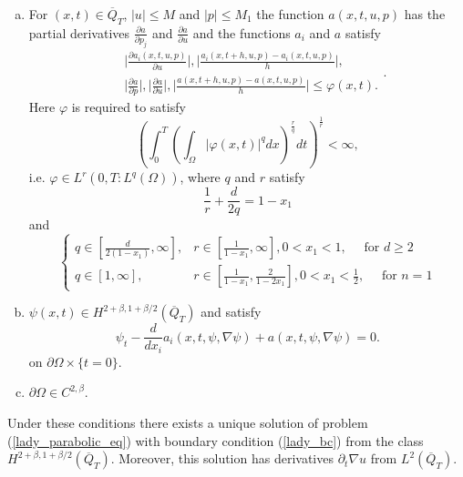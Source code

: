 \documentclass[11pt, a4paper]{article}
\begin{document}
\begin{theorem}
\begin{enumerate}[a)]
	\item For $(x,t) \in \overline{Q}_T$, $|u| \leq M$ and $|p| \leq M_1$ the function $a(x,t,u,p)$ has the partial derivatives $\frac{\partial a}{\partial p_j}$ and $\frac{\partial a}{\partial u}$ and the functions $a_i$ and $a$ satisfy
	\begin{equation}
	\label{exist_cond4}
	\begin{split}
		&\Bigg| \frac{\partial a_i(x,t,u,p)}{\partial u}\Bigg|, \Bigg|\frac{a_i(x,t+h,u,p) - 		a_i(x,t,u,p)}{h}\Bigg|, \\
		&\Bigg|\frac{\partial a}{\partial p}\Bigg|, \Bigg|\frac{\partial a}{\partial u}\Bigg|, \Bigg|\frac{a(x,t+h,u,p) - a(x,t,u,p)}{h} \Bigg| \leq \varphi(x,t).
	\end{split}.
	\end{equation}
	Here $\varphi$ is required to satisfy
	\begin{equation*}
	\left( \int_0^T \left(\int_\Omega |\varphi(x,t)|^q dx\right)^\frac{r}{q} dt 			\right)^\frac{1}{r} < \infty,
	\end{equation*}
	i.e. $\varphi \in L^r(0,T: L^q(\Omega))$, where $q$ and $r$ satisfy
	\begin{equation*}
	\frac{1}{r} + \frac{d}{2q} = 1 - x_1
	\end{equation*}
	and
	\begin{equation*}
	\begin{cases}
		q\in \left[\frac{d}{2(1-x_1)},\infty\right], &r\in \left[\frac{1}{1-x_1},\infty \right], 0<x_1<1, \quad \text{ for } d \geq 2 \\
		q \in [1, \infty], &r \in \left[\frac{1}{1-x_1},\frac{2}{1-2x_1}\right], 0<x_1<\frac{1}{2}, \quad \text{ for } n=1
	\end{cases}
\end{equation*}
	
	\item $\psi(x,t) \in H^{2+\beta, 1+\beta/2}(\overline{Q}_T)$ and satisfy
	\begin{equation}
	\label{exist_cond5}
	\psi_t - \frac{d}{dx_i}a_i(x,t,\psi,\nabla\psi) + a(x,t,\psi,\nabla\psi) = 0.
	\end{equation}
	on $\partial \Omega \times \{t=0\}$.
	
	\item $\partial \Omega \in C^{2,\beta}$.
\end{enumerate}

Under these conditions there exists a unique solution of problem (\ref{lady_parabolic_eq})  with boundary condition (\ref{lady_bc}) from the class $H^{2+\beta, 1+\beta/2}(\overline{Q}_T)$. Moreover, this solution has derivatives $\partial_t \nabla u$ from $L^2(\overline{Q}_T)$.
\end{theorem}
\end{document}
